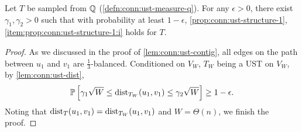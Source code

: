\begin{lemma} \label{lem:conn:ust-structure-q-i}
  Let $T$ be sampled from $\mathbb{Q}$ (\cref{defn:conn:ust-measure-q}).
  For any $\epsilon>0$, there exist $\gamma_1,\gamma_2>0$ such that with probability at least $1-\epsilon$, \cref{prop:conn:ust-structure-1}, \cref{item:prop:conn:ust-structure-1:i} holds for $T$.
\end{lemma}
\begin{proof}
  As we discussed in the proof of \cref{lem:conn:ust-contig}, all edges on the path between $u_1$ and $v_1$ are $\frac 13$-balanced.
  Conditioned on $V_W$, $T_W$ being a UST on $V_W$,
  by \cref{lem:conn:ust-dist},
  \begin{align*}
    \mathbb{P}\left[ \gamma_1 \sqrt W \le \operatorname{\mathrm{dist}}_{T_W}(u_1,v_1) \le \gamma_2 \sqrt W \right] \ge 1-\epsilon.
  \end{align*}
  Noting that $\operatorname{\mathrm{dist}}_T(u_1,v_1)=\operatorname{\mathrm{dist}}_{T_W}(u_1,v_1)$ and $W = \Theta(n)$, we finish the proof.
\end{proof}

